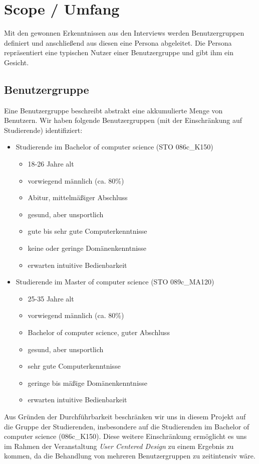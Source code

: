\documentclass{article}
\begin{document}
\newpage

\section{Scope / Umfang}

Mit den gewonnen Erkenntnissen aus den Interviews werden Benutzergruppen definiert und anschließend aus diesen eine Persona abgeleitet. Die Persona repräsentiert eine typischen Nutzer einer Benutzergruppe und gibt ihm ein Gesicht.

\subsection{Benutzergruppe}

Eine Benutzergruppe beschreibt abstrakt eine akkumulierte Menge von Benutzern. Wir haben folgende Benutzergruppen (mit der Einschränkung auf Studierende) identifiziert:
\begin{itemize}
\item Studierende im Bachelor of computer science (STO 086c\_K150)
	\begin{itemize}
	\item 18-26 Jahre alt
	\item vorwiegend männlich (ca. 80\%)
	\item Abitur, mittelmäßiger Abschluss
	\item gesund, aber unsportlich
	\item gute bis sehr gute Computerkenntnisse
	\item keine oder geringe Domänenkenntnisse
	\item erwarten intuitive Bedienbarkeit
	\end{itemize}
\item Studierende im Master of computer science (STO 089c\_MA120)
	\begin{itemize}
	\item 25-35 Jahre alt
	\item vorwiegend männlich (ca. 80\%)
	\item Bachelor of computer science, guter Abschluss
	\item gesund, aber unsportlich
	\item sehr gute Computerkenntnisse
	\item geringe bis mäßige Domänenkenntnisse
	\item erwarten intuitive Bedienbarkeit
	\end{itemize}
\end{itemize}
Aus Gründen der Durchführbarkeit beschränken wir uns in diesem Projekt auf die Gruppe
der Studierenden, insbesondere auf die Studierenden im Bachelor of computer science (086c\_K150). Diese weitere Einschränkung ermöglicht es uns im Rahmen der Veranstaltung \textit{User Centered Design} zu einem Ergebnis zu kommen, da die Behandlung von mehreren Benutzergruppen zu zeitintensiv wäre.
\end{document}
